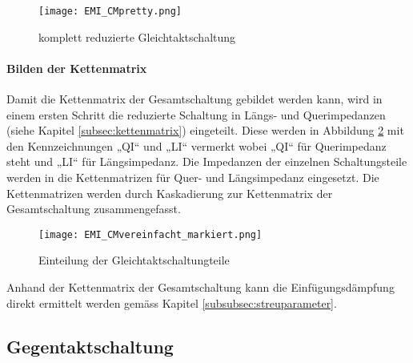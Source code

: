 \begin{figure}[H]
	\centering
	\texttt{[image: EMI\_CMpretty.png]}
	\caption{komplett reduzierte Gleichtaktschaltung}
	\label{fig:CMSchaltungvereinfacht}
\end{figure}

\paragraph{Bilden der Kettenmatrix}\label{para:kettenGleichtakt}
Damit die Kettenmatrix der Gesamtschaltung gebildet werden kann, wird in einem ersten Schritt die reduzierte Schaltung in Längs- und Querimpedanzen (siehe Kapitel \ref{subsec:kettenmatrix}) eingeteilt. Diese werden in Abbildung \ref{fig:cmschaltungEingeteilt} mit den Kennzeichnungen „QI“ und „LI“ vermerkt wobei „QI“ für Querimpedanz steht und „LI“ für Längsimpedanz. Die Impedanzen der einzelnen Schaltungsteile werden in die Kettenmatrizen für Quer- und Längsimpedanz eingesetzt. Die Kettenmatrizen werden durch Kaskadierung zur Kettenmatrix der Gesamtschaltung zusammengefasst.
\begin{figure}[H]
		\centering
		\texttt{[image: EMI\_CMvereinfacht\_markiert.png]}
		\label{fig:cmschaltungEingeteilt}
		\caption{Einteilung der Gleichtaktschaltungteile}
\end{figure}
Anhand der Kettenmatrix der Gesamtschaltung kann die Einfügungsdämpfung direkt ermittelt werden gemäss Kapitel \ref{subsubsec:streuparameter}. 

\subsection{Gegentaktschaltung}\label{subsec:zusammenfassungGegentakt}
